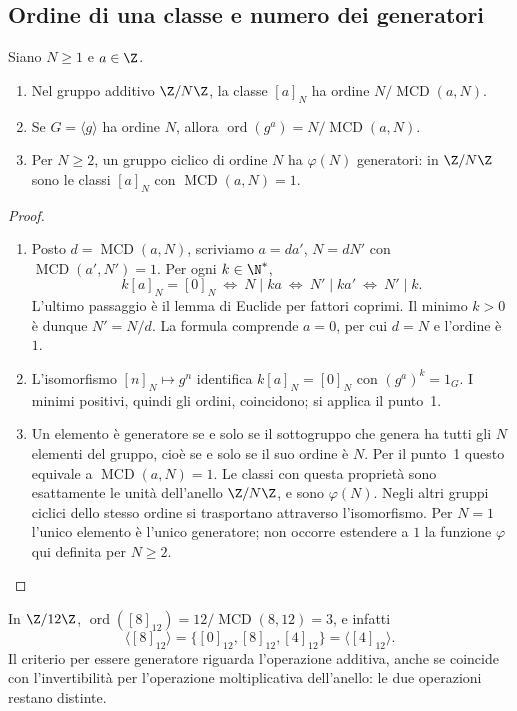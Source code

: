 \subsection{Ordine di una classe e numero dei generatori}
\begin{proposizione}\label{prop:ordine-classe}
Siano $N\ge1$ e $a\in\Z$.
\begin{enumerate}[label=\arabic*.]
\item Nel gruppo additivo $\Z/N\Z$, la classe $[a]_N$ ha ordine $N/\operatorname{MCD}(a,N)$.
\item Se $G=\langle g\rangle$ ha ordine $N$, allora $\operatorname{ord}(g^a)=N/\operatorname{MCD}(a,N)$.
\item Per $N\ge2$, un gruppo ciclico di ordine $N$ ha $\varphi(N)$ generatori: in $\Z/N\Z$ sono le classi $[a]_N$ con $\operatorname{MCD}(a,N)=1$.
\end{enumerate}
\end{proposizione}
\begin{proof}
\begin{enumerate}[label=\arabic*.]
\item Posto $d=\operatorname{MCD}(a,N)$, scriviamo $a=da'$, $N=dN'$ con $\operatorname{MCD}(a',N')=1$. Per ogni $k\in\N^*$,
\[
k[a]_N=[0]_N\ \Longleftrightarrow\ N\mid ka
\ \Longleftrightarrow\ N'\mid ka'
\ \Longleftrightarrow\ N'\mid k.
\]
L'ultimo passaggio è il lemma di Euclide per fattori coprimi. Il minimo $k>0$ è dunque $N'=N/d$. La formula comprende $a=0$, per cui $d=N$ e l'ordine è $1$.
\item L'isomorfismo $[n]_N\mapsto g^n$ identifica $k[a]_N=[0]_N$ con $(g^a)^k=1_G$. I minimi positivi, quindi gli ordini, coincidono; si applica il punto~1.
\item Un elemento è generatore se e solo se il sottogruppo che genera ha tutti gli $N$ elementi del gruppo, cioè se e solo se il suo ordine è $N$. Per il punto~1 questo equivale a $\operatorname{MCD}(a,N)=1$. Le classi con questa proprietà sono esattamente le unità dell'anello $\Z/N\Z$, e sono $\varphi(N)$. Negli altri gruppi ciclici dello stesso ordine si trasportano attraverso l'isomorfismo. Per $N=1$ l'unico elemento è l'unico generatore; non occorre estendere a $1$ la funzione $\varphi$ qui definita per $N\ge2$.
\end{enumerate}
\end{proof}

\begin{esempio}
In $\Z/12\Z$, $\operatorname{ord}([8]_{12})=12/\operatorname{MCD}(8,12)=3$, e infatti
\[
\langle[8]_{12}\rangle=\{[0]_{12},[8]_{12},[4]_{12}\}=\langle[4]_{12}\rangle.
\]
Il criterio per essere generatore riguarda l'operazione additiva, anche se coincide con l'invertibilità per l'operazione moltiplicativa dell'anello: le due operazioni restano distinte.
\end{esempio}

